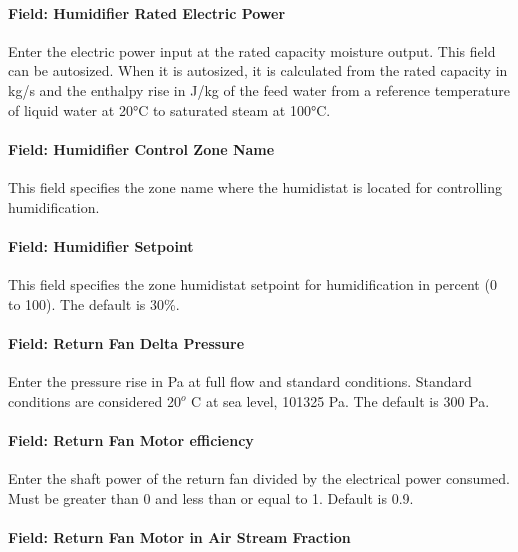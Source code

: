 \paragraph{Field: Humidifier Rated Electric Power}\label{field-humidifier-rated-electric-power}

Enter the electric power input at the rated capacity moisture output. This field can be autosized. When it is autosized, it is calculated from the rated capacity in kg/s and the enthalpy rise in J/kg of the feed water from a reference temperature of liquid water at 20°C to saturated steam at 100°C.

\paragraph{Field: Humidifier Control Zone Name}\label{field-humidifier-control-zone-name}

This field specifies the zone name where the humidistat is located for controlling humidification.

\paragraph{Field: Humidifier Setpoint}\label{field-humidifier-setpoint}

This field specifies the zone humidistat setpoint for humidification in percent (0 to 100). The default is 30\%.

\paragraph{Field: Return Fan Delta Pressure}\label{field-return-fan-delta-pressure}

Enter the pressure rise in Pa at full flow and standard conditions. Standard conditions are considered 20\(^{o}\) C at sea level, 101325 Pa. The default is 300 Pa.

\paragraph{Field: Return Fan Motor efficiency}\label{field-return-fan-motor-efficiency}

Enter the shaft power of the return fan divided by the electrical power consumed. Must be greater than 0 and less than or equal to 1. Default is 0.9.

\paragraph{Field: Return Fan Motor in Air Stream Fraction}\label{field-return-fan-motor-in-air-stream-fraction}

